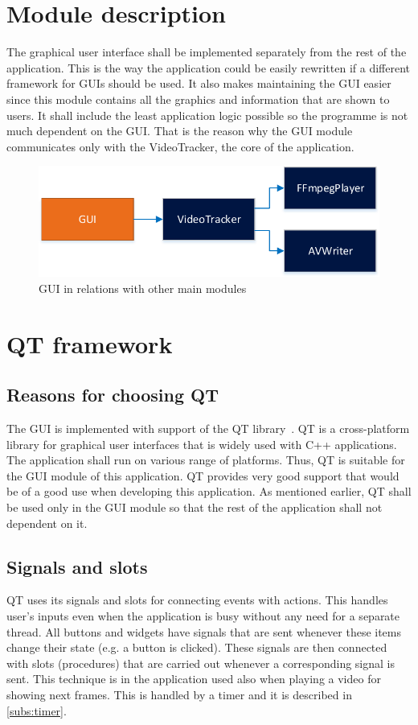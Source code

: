 \section{Module description}
The graphical user interface shall be implemented separately from the rest of the application. This is the way the application could be easily rewritten if a different framework for GUIs should be used. It also makes maintaining the GUI easier since this module contains all the graphics and information that are shown to users. It shall include the least application logic possible so the programme is not much dependent on the GUI. That is the reason why the GUI module communicates only with the VideoTracker, the core of the application.
\begin{figure}[!htbp]
\centering
\includegraphics{fig/gui}
\caption{GUI in relations with other main modules}
\label{fig:gui}
\end{figure}

\section{QT framework}
\subsection{Reasons for choosing QT}
The GUI is implemented with support of the QT library~\cite{qt_programming}. QT is a cross-platform library for graphical user interfaces that is widely used with C++ applications. The application shall run on various range of platforms. Thus, QT is suitable for the GUI module of this application. QT provides very good support that would be of a good use when developing this application. As mentioned earlier, QT shall be used only in the GUI module so that the rest of the application shall not dependent on it.

\subsection{Signals and slots}
QT uses its signals and slots for connecting events with actions. This handles user's inputs even when the application is busy without any need for a separate thread. All buttons and widgets have signals that are sent whenever these items change their state (e.g. a button is clicked). These signals are then connected with slots (procedures) that are carried out whenever a corresponding signal is sent. This technique is in the application used also when playing a video for showing next frames. This is handled by a timer and it is described in \autoref{subs:timer}.

